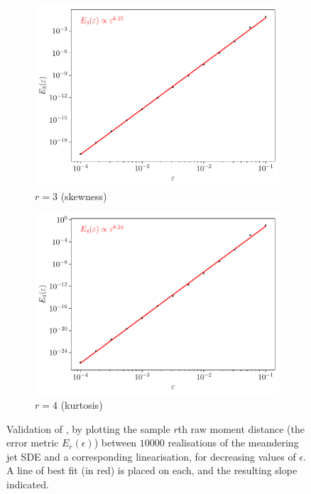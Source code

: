 \begin{figure}
\begin{center}
\begin{subfigure}{0.49\textwidth}
			\includegraphics[width=\textwidth]{chp04_paper_numerics/figures/rossby/str_err_r_3.0.pdf}
			\caption{\(r = 3\) (skewness)}
			\label{fig:gamma_z_valid_3}
		\end{subfigure}
		\begin{subfigure}{0.49\textwidth}
			\includegraphics[width=\textwidth]{chp04_paper_numerics/figures/rossby/str_err_r_4.0.pdf}
			\caption{\(r = 4\) (kurtosis)}
			\label{fig:gamma_z_valid_4}
		\end{subfigure}

		\caption{Validation of , by plotting the sample \(r\)th raw moment distance (the error metric \(E_r(\epsilon)\)) between \(10000\) realisations of the meandering jet SDE and a corresponding linearisation, for decreasing values of \(\epsilon\).
			A line of best fit (in red) is placed on each, and the resulting slope indicated.}
		\label{fig:gamma_z_valid}
	\end{center}
\end{figure}


